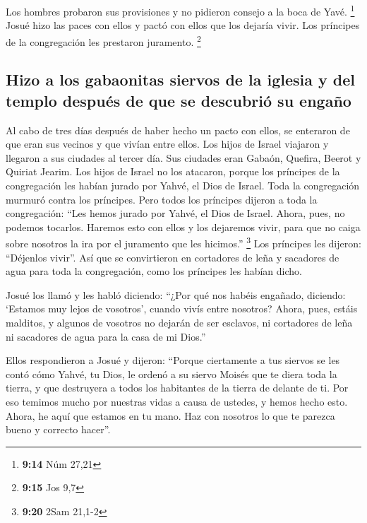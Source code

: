 \begin{paracol}{2}
 Los hombres probaron sus provisiones y no pidieron
consejo a la boca de Yavé. \footnote{\textbf{9:14} Núm 27,21}
 Josué hizo las paces con ellos y pactó con ellos que los
dejaría vivir. Los príncipes de la congregación les prestaron juramento.
\footnote{\textbf{9:15} Jos 9,7}

\hypertarget{hizo-a-los-gabaonitas-siervos-de-la-iglesia-y-del-templo-despuuxe9s-de-que-se-descubriuxf3-su-engauxf1o}{%
\subsection{Hizo a los gabaonitas siervos de la iglesia y del templo
después de que se descubrió su
engaño}\label{hizo-a-los-gabaonitas-siervos-de-la-iglesia-y-del-templo-despuuxe9s-de-que-se-descubriuxf3-su-engauxf1o}}

 Al cabo de tres días después de haber hecho un pacto con
ellos, se enteraron de que eran sus vecinos y que vivían entre ellos.
 Los hijos de Israel viajaron y llegaron a sus ciudades
al tercer día. Sus ciudades eran Gabaón, Quefira, Beerot y Quiriat
Jearim.  Los hijos de Israel no los atacaron, porque los
príncipes de la congregación les habían jurado por Yahvé, el Dios de
Israel. Toda la congregación murmuró contra los príncipes.
 Pero todos los príncipes dijeron a toda la congregación:
``Les hemos jurado por Yahvé, el Dios de Israel. Ahora, pues, no podemos
tocarlos.  Haremos esto con ellos y los dejaremos vivir,
para que no caiga sobre nosotros la ira por el juramento que les
hicimos.'' \footnote{\textbf{9:20} 2Sam 21,1-2}  Los
príncipes les dijeron: ``Déjenlos vivir''. Así que se convirtieron en
cortadores de leña y sacadores de agua para toda la congregación, como
los príncipes les habían dicho.

 Josué los llamó y les habló diciendo: ``¿Por qué nos
habéis engañado, diciendo: `Estamos muy lejos de vosotros', cuando vivís
entre nosotros?  Ahora, pues, estáis malditos, y algunos
de vosotros no dejarán de ser esclavos, ni cortadores de leña ni
sacadores de agua para la casa de mi Dios.''

 Ellos respondieron a Josué y dijeron: ``Porque
ciertamente a tus siervos se les contó cómo Yahvé, tu Dios, le ordenó a
su siervo Moisés que te diera toda la tierra, y que destruyera a todos
los habitantes de la tierra de delante de ti. Por eso temimos mucho por
nuestras vidas a causa de ustedes, y hemos hecho esto. 
Ahora, he aquí que estamos en tu mano. Haz con nosotros lo que te
parezca bueno y correcto hacer''.


\end{paracol}
